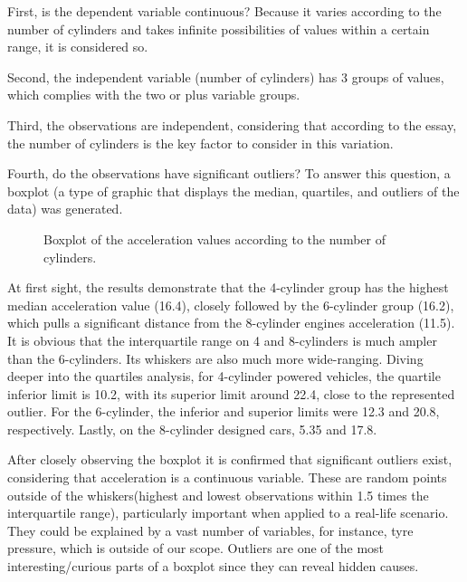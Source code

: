 \documentclass[conference]{IEEEtran}
\begin{document}
First, is the dependent variable continuous? Because it varies according to the number of cylinders and takes infinite possibilities of values within a certain range, it is considered so.

Second, the independent variable (number of cylinders) has 3 groups of values, which complies with the two or plus variable groups.

Third, the observations are independent, considering that according to the essay, the number of cylinders is the key factor to consider in this variation.

Fourth, do the observations have significant outliers? To answer this question, a boxplot (a type of graphic that displays the median, quartiles, and outliers of the data) was generated.\\

\begin{figure}[htbp]
    \caption{Boxplot of the acceleration values according to the number of cylinders.}
    \label{vehicle_boxplot}
\end{figure}

At first sight, the results demonstrate that the 4-cylinder group has the highest median acceleration value (16.4), closely followed by the 6-cylinder group (16.2), 
which pulls a significant distance from the 8-cylinder engines acceleration (11.5). 
It is obvious that the interquartile range on 4 and 8-cylinders is much ampler than the 6-cylinders. 
Its whiskers are also much more wide-ranging. 
Diving deeper into the quartiles analysis, for 4-cylinder powered vehicles, the quartile inferior limit is 10.2, with its superior limit around 22.4, close to the represented outlier. 
For the 6-cylinder, the inferior and superior limits were 12.3 and 20.8, respectively. 
Lastly, on the 8-cylinder designed cars, 5.35 and 17.8. 

After closely observing the boxplot it is confirmed that significant outliers exist, considering that acceleration is a continuous variable. 
These are random points outside of the whiskers(highest and lowest observations within 1.5 times the interquartile range), particularly important when applied to a real-life scenario. 
They could be explained by a vast number of variables, for instance, tyre pressure, which is outside of our scope. 
Outliers are one of the most interesting/curious parts of a boxplot since they can reveal hidden causes.\\
\end{document}
